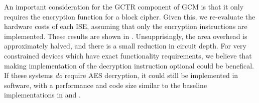 An important consideration for the GCTR component of GCM is that it only
requires the encryption function for a block cipher.
Given this, we re-evaluate the hardware costs of each ISE, assuming that
only the encryption instructions are implemented.
These results are shown in .
Unsupprisingly, the area overhead is approximately halved, and there is
a small reduction in circuit depth.
For very constrained devices which have exact functionality
requirements, we believe that making implementation of the decryption
instruction optional could be benefical.
If these systems {\em do} require AES decryption, it could still be
implemented in software, with a performance and code size similar
to the baseline implementations in
and
.


